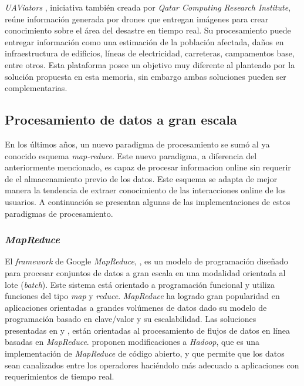 \textit{UAViators} \cite{UAViators}, iniciativa también creada por \textit{Qatar Computing Research Institute}, reúne información generada por drones que entregan imágenes para crear conocimiento sobre el área del desastre en tiempo real. Su procesamiento puede entregar información como una estimación de la población afectada, daños en infraestructura de edificios, líneas de electricidad, carreteras, campamentos base, entre otros. Esta plataforma posee un objetivo muy diferente al planteado por la solución propuesta en esta memoria, sin embargo ambas soluciones pueden ser complementarias.

\subsection{Procesamiento de datos a gran escala}
\label{arte:SPS}

En los últimos años, un nuevo paradigma de procesamiento se sumó al ya conocido esquema \textit{map-reduce}. Este nuevo paradigma, a diferencia del anteriormente mencionado, es capaz de procesar informacion online sin requerir de el almacenamiento previo de los datos. Este esquema se adapta de mejor manera la tendencia de extraer conocimiento de las interacciones online de los usuarios. A continuación se presentan algunas de las implementaciones de estos paradigmas de procesamiento.

\subsubsection*{\textit{MapReduce}}
\label{arte:SPS:mapreduce}

El \textit{framework} de Google \textit{MapReduce}, \cite{DeanMapReduce}, es un modelo de programación diseñado para procesar conjuntos de datos a gran escala en una modalidad orientada al lote (\textit{batch}). Este sistema está orientado a programación funcional y utiliza funciones del tipo \textit{map} y \textit{reduce}. \textit{MapReduce} ha logrado gran popularidad en aplicaciones orientadas a grandes volúmenes de datos dado su modelo de programación basado en clave/valor y su escalabilidad. Las soluciones presentadas en \cite{CondieMapReduce} y \cite{VermaMapReduce}, están orientadas al procesamiento de flujos de datos en línea basadas en \textit{MapReduce}. \cite{CondieMapReduce} proponen modificaciones a \textit{Hadoop}, que es una implementación de \textit{MapReduce} de código abierto, y que permite que los datos sean canalizados entre los operadores haciéndolo más adecuado a aplicaciones con requerimientos de tiempo real. 

